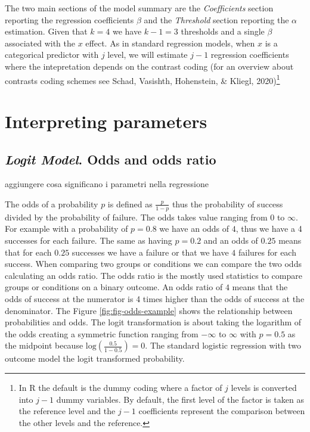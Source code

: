 \documentclass[
  man,floatsintext]{apa6}
\begin{document}
\normalsize

The two main sections of the model summary are the \emph{Coefficients} section reporting the regression coefficients \(\beta\) and the \emph{Threshold} section reporting the \(\alpha\) estimation. Given that \(k = 4\) we have \(k - 1 = 3\) thresholds and a single \(\beta\) associated with the \(x\) effect. As in standard regression models, when \(x\) is a categorical predictor with \(j\) level, we will estimate \(j - 1\) regression coefficients where the intepretation depends on the contrast coding (for an overview about contrasts coding schemes see Schad, Vasishth, Hohenstein, \& Kliegl, 2020)\footnote{In R the default is the dummy coding where a factor of \(j\) levels is converted into \(j - 1\) dummy variables. By default, the first level of the factor is taken as the reference level and the \(j - 1\) coefficients represent the comparison between the other levels and the reference.}

\section{Interpreting parameters}\label{interpreting-parameters}

\subsection{\texorpdfstring{\emph{Logit Model}. Odds and odds ratio}{Logit Model. Odds and odds ratio}}\label{logit-model.-odds-and-odds-ratio}

aggiungere cosa significano i parametri nella regressione

The odds of a probability \(p\) is defined as \(\frac{p}{1 - p}\) thus the probability of success divided by the probability of failure. The odds takes value ranging from 0 to \(\infty\). For example with a probability of \(p = 0.8\) we have an odds of \(4\), thus we have a 4 successes for each failure. The same as having \(p = 0.2\) and an odds of \(0.25\) means that for each \(0.25\) successes we have a failure or that we have \(4\) failures for each success. When comparing two groups or conditions we can compare the two odds calculating an odds ratio. The odds ratio is the mostly used statistics to compare groups or conditions on a binary outcome. An odds ratio of \(4\) means that the odds of success at the numerator is 4 times higher than the odds of success at the denominator. The Figure \ref{fig:fig-odds-example} shows the relationship between probabilities and odds. The logit transformation is about taking the logarithm of the odds creating a symmetric function ranging from \(-\infty\) to \(\infty\) with \(p = 0.5\) as the midpoint because \(\text{log}(\frac{0.5}{1 - 0.5}) = 0\). The standard logistic regression with two outcome model the logit transformed probability.
\end{document}
